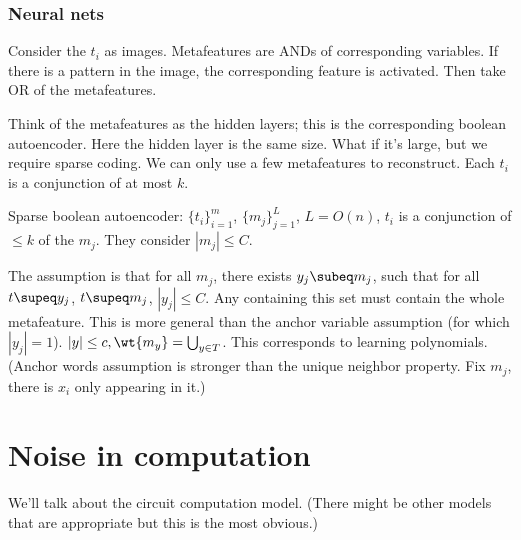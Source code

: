 


\subsubsection{Neural nets}
Consider the $t_i$ as images. Metafeatures are ANDs of corresponding variables. If there is a pattern in the image, the corresponding feature is activated.
Then take OR of the metafeatures.

Think of the metafeatures as the hidden layers; this is the corresponding boolean autoencoder.
Here the hidden layer is the same size. What if it's large, but we require sparse coding. We can only use a few metafeatures to reconstruct. Each $t_i$ is a conjunction of at most $k$.

Sparse boolean autoencoder: $\{t_i\}_{i=1}^m$, $\{m_j\}_{j=1}^L$, $L=O(n)$, $t_i$ is a conjunction of $\le k$ of the $m_j$. They consider $|m_j|\le C$. %

The assumption is that for all $m_j$, there exists $y_j\subeq m_j$, such that for all $t\supeq y_j$, $t\supeq m_j$, $|y_j|\le C$.
Any containing this set must contain the whole metafeature. This is more general than the anchor variable assumption (for which $|y_j|=1$).  $|y|\le c, \wt{m_y}=\bigcup_{y\in T}$. This corresponds to learning polynomials.
(Anchor words assumption is stronger than the unique neighbor property. Fix $m_j$, there is $x_i$ only appearing in it.)




\section{Noise in computation}

We'll talk about the circuit computation model. (There might be other models that are appropriate but this is the most obvious.)

